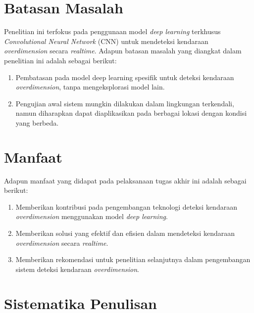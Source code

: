 \section{Batasan Masalah}
\label{sec:batasanmasalah}

Penelitian ini terfokus pada penggunaan model \emph{deep learning} terkhusus \emph{Convolutional Neural Network} (CNN) untuk mendeteksi kendaraan \emph{overdimension} secara \emph{realtime}. Adapun batasan masalah yang diangkat dalam penelitian ini adalah sebagai berikut:

\begin{enumerate}[nolistsep]

  \item Pembatasan pada model deep learning spesifik untuk deteksi kendaraan \emph{overdimension}, tanpa mengeksplorasi model lain.
  
  \item Pengujian awal sistem mungkin dilakukan dalam lingkungan terkendali, namun diharapkan dapat diaplikasikan pada berbagai lokasi dengan kondisi yang berbeda.
  
\end{enumerate}

\section{Manfaat}
\label{sec:manfaatpenulisan}

Adapun manfaat yang didapat pada pelaksanaan tugas akhir ini adalah sebagai berikut:

\begin{enumerate}[nolistsep]

  \item Memberikan kontribusi pada pengembangan teknologi deteksi kendaraan \emph{overdimension} menggunakan model \emph{deep learning}.
  
  \item Memberikan solusi yang efektif dan efisien dalam mendeteksi kendaraan \emph{overdimension} secara \emph{realtime}.
  
  \item Memberikan rekomendasi untuk penelitian selanjutnya dalam pengembangan sistem deteksi kendaraan \emph{overdimension}.
  
\end{enumerate}

\section{Sistematika Penulisan}
\label{sec:sistematikapenulisan
}

